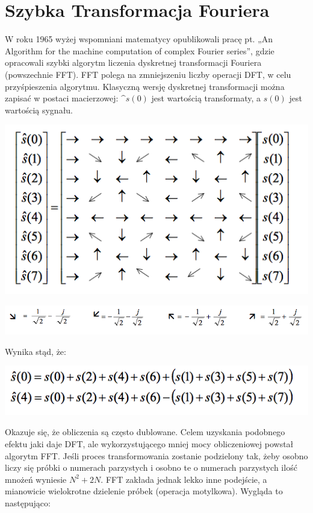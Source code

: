 \documentclass{article}
\begin{document}
\section{Szybka Transformacja Fouriera}
W roku 1965 wyżej wspomniani matematycy opublikowali pracę pt. „An Algorithm for the machine computation of complex Fourier series”, gdzie opracowali szybki algorytm liczenia dyskretnej transformacji Fouriera (powszechnie FFT). FFT polega na zmniejszeniu liczby operacji DFT, w celu przyśpieszenia algorytmu. Klasyczną wersję dyskretnej transformacji można zapisać w postaci macierzowej: $\^s(0)$ jest wartością transformaty, a $s(0)$ jest wartością sygnału.
\begin{center}
    \includegraphics[scale=0.4]{sc1}        
\end{center}
\begin{center}
    \includegraphics[scale=0.4]{cs3}        
\end{center}
Wynika stąd, że:
\begin{center}
    \includegraphics[scale=0.3]{sc2}
\end{center}
Okazuje się, że obliczenia są często dublowane. Celem uzyskania podobnego efektu jaki daje DFT, ale wykorzystującego mniej mocy obliczeniowej powstał algorytm FFT. Jeśli proces transformowania zostanie podzielony tak, żeby osobno liczy się próbki o numerach parzystych i osobno te o numerach parzystych ilość mnożeń wyniesie $N^2 + 2N$. FFT zakłada jednak lekko inne podejście, a mianowicie wielokrotne dzielenie próbek (operacja motylkowa). Wygląda to następująco:
\end{document}
